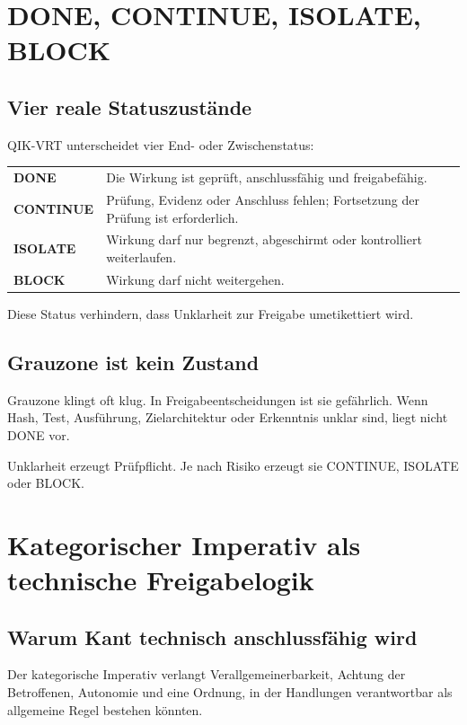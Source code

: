 \documentclass[11pt,a4paper,oneside]{book}
\begin{document}
\chapter{DONE, CONTINUE, ISOLATE, BLOCK}

\section{Vier reale Statuszustände}

QIK-VRT unterscheidet vier End- oder Zwischenstatus:

\begin{longtable}{>{\bfseries}p{}p{}}
\toprule
DONE & Die Wirkung ist geprüft, anschlussfähig und freigabefähig. \\
CONTINUE & Prüfung, Evidenz oder Anschluss fehlen; Fortsetzung der Prüfung ist erforderlich. \\
ISOLATE & Wirkung darf nur begrenzt, abgeschirmt oder kontrolliert weiterlaufen. \\
BLOCK & Wirkung darf nicht weitergehen. \\
\bottomrule
\end{longtable}

Diese Status verhindern, dass Unklarheit zur Freigabe umetikettiert wird.

\section{Grauzone ist kein Zustand}

Grauzone klingt oft klug. In Freigabeentscheidungen ist sie gefährlich. Wenn Hash, Test, Ausführung, Zielarchitektur oder Erkenntnis unklar sind, liegt nicht DONE vor.

Unklarheit erzeugt Prüfpflicht. Je nach Risiko erzeugt sie CONTINUE, ISOLATE oder BLOCK.

\chapter{Kategorischer Imperativ als technische Freigabelogik}

\section{Warum Kant technisch anschlussfähig wird}

Der kategorische Imperativ verlangt Verallgemeinerbarkeit, Achtung der Betroffenen, Autonomie und eine Ordnung, in der Handlungen verantwortbar als allgemeine Regel bestehen könnten.
\end{document}
